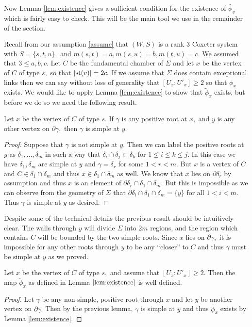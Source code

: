 \documentclass[class=book, crop=false,12 pt]{standalone}
\begin{document}
Now Lemma \ref{lem:existence} gives a sufficient condition for the existence of $\tilde{\phi_v}$ which is fairly easy to check. This will be the main tool we use in the remainder of the section. 

Recall from our assumption \eqref{assume} that $(W,S)$ is a rank 3 Coxeter system with $S=\{s,t,u\},$ and $m(s,t)=a,m(s,u)=b,m(t,u)=c.$ We assumed that $3\le a,b,c.$ Let $C$ be the fundamental chamber of $\Sigma$ and let $x$ be the vertex of $C$ of type $s,$ so that $|\mathrm{st}(v)|=2c.$ If we assume that $\Sigma$ does contain exceptional links then we can say without loss of generality that $[U_x:U'_x]\ge 2$ so that $\phi_x$ exists. We would like to apply Lemma \ref{lem:existence} to show that $\tilde{\phi}_x$ exists, but before we do so we need the following result.

\begin{lemma}
\label{lem:xpos}
	Let $x$ be the vertex of $C$ of type $s.$ If $\gamma$ is any positive root at $x,$ and $y$ is any other vertex on $\partial\gamma,$ then $\gamma$ is simple at $y.$
\end{lemma}
\begin{proof} 
	Suppose that $\gamma$ is not simple at $y.$ Then we can label the positive roots at $y$ as $\delta_1,\dots,\delta_m$ in such a way that $\delta_i\cap \delta_j\subset \delta_k$ for $1\le i\le k\le j.$ In this case we have $\delta_1,\delta_m$ are simple at $y$ and $\gamma=\delta_r$ for some $1<r<m.$ But $x$ is a vertex of $C$ and $C\in \delta_1\cap \delta_m$ and thus $x\in \delta_1\cap \delta_m$ as well. We know that $x$ lies on $\partial \delta_r$ by assumption and thus $x$ is an element of $\partial \delta_r \cap \delta_1\cap \delta_m.$ But this is impossible as we can observe from the geometry of $\Sigma$ that $\partial \delta_i\cap \delta_1\cap \delta_m=\{y\}$ for all $1<i<m.$ Thus $\gamma$ is simple at $y$ as desired.
\end{proof}
Despite some of the technical details the previous result should be intuitively clear. The walls through $y$ will divide $\Sigma$ into $2m$ regions, and the region which contains $C$ will be bounded by the two simple roots. Since $x$ lies on $\partial \gamma,$ it is impossible for any other roots through $y$ to be any ``closer'' to $C$ and thus $\gamma$ must be simple at $y$ as we proved.
\begin{cor}
	\label{cor:phix}
	Let $x$ be the vertex of $C$ of type $s,$ and assume that $[U_x:U'_x]\ge 2.$ Then the map $\tilde{\phi}_x$ as defined in Lemma $\ref{lem:existence}$ is well defined.
\end{cor}
\begin{proof}
	Let $\gamma$ be any non-simple, positive root through $x$ and let $y$ be another vertex on $\partial \gamma.$ Then by the previous lemma, $\gamma$ is simple at $y$ and thus $\tilde{\phi_x}$ exists by Lemma \ref{lem:existence}.
\end{proof}
\end{document}
